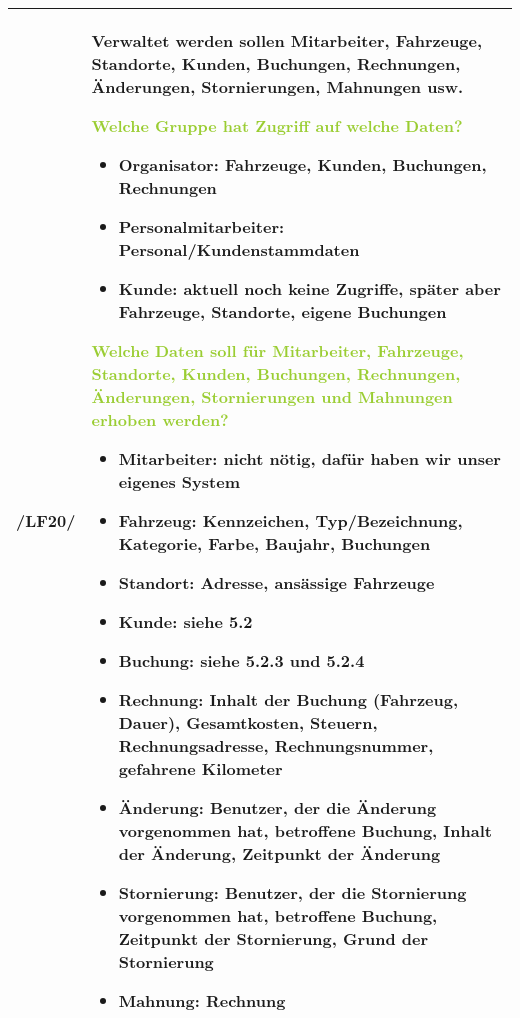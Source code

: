 \begin{tabular}{l | p{13cm}}
    \hline
    /LF20/ & Verwaltet werden sollen Mitarbeiter, Fahrzeuge, Standorte, Kunden, Buchungen, Rechnungen, Änderungen, Stornierungen, Mahnungen usw.

    \textcolor{YellowGreen}{Welche Gruppe hat Zugriff auf welche Daten?}

    \textcolor{NavyBlue}{
        \begin{itemize}
            \item Organisator: Fahrzeuge, Kunden, Buchungen, Rechnungen
            \item Personalmitarbeiter: Personal/Kundenstammdaten
            \item Kunde: aktuell noch keine Zugriffe, später aber Fahrzeuge, Standorte, eigene Buchungen
        \end{itemize} 
    }



    \textcolor{YellowGreen}{Welche Daten soll für Mitarbeiter, Fahrzeuge, Standorte, Kunden, Buchungen, Rechnungen, Änderungen, Stornierungen und Mahnungen erhoben werden?}

    \textcolor{NavyBlue}{
        \begin{itemize}
            \item  Mitarbeiter: nicht nötig, dafür haben wir unser eigenes System
            \item Fahrzeug: Kennzeichen, Typ/Bezeichnung, Kategorie, Farbe, Baujahr, Buchungen 
            \item Standort: Adresse, ansässige Fahrzeuge 
            \item Kunde: siehe 5.2
            \item Buchung: siehe 5.2.3 und 5.2.4 
            \item Rechnung: Inhalt der Buchung (Fahrzeug, Dauer), Gesamtkosten, Steuern, Rechnungsadresse, Rechnungsnummer, gefahrene Kilometer 
            \item Änderung: Benutzer, der die Änderung vorgenommen hat, betroffene Buchung, Inhalt der Änderung, Zeitpunkt der Änderung 
            \item Stornierung: Benutzer, der die Stornierung vorgenommen hat, betroffene Buchung, Zeitpunkt der Stornierung, Grund der Stornierung 
            \item Mahnung: Rechnung
        \end{itemize}       
    } \\
    \hline
\end{tabular}

